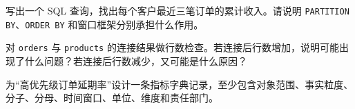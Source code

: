\begin{exercise}
写出一个 SQL 查询，找出每个客户最近三笔订单的累计收入。请说明 \texttt{PARTITION BY}、\texttt{ORDER BY} 和窗口框架分别承担什么作用。
\end{exercise}

\begin{exercise}
对 \texttt{orders} 与 \texttt{products} 的连接结果做行数检查。若连接后行数增加，说明可能出现了什么问题？若连接后行数减少，又可能是什么原因？
\end{exercise}

\begin{exercise}
为“高优先级订单延期率”设计一条指标字典记录，至少包含对象范围、事实粒度、分子、分母、时间窗口、单位、维度和责任部门。
\end{exercise}

